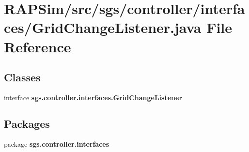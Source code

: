 \section{R\-A\-P\-Sim/src/sgs/controller/interfaces/\-Grid\-Change\-Listener.java File Reference}
\label{_grid_change_listener_8java}
\subsection*{Classes}
\begin{DoxyCompactItemize}
\item 
interface {\bf sgs.\-controller.\-interfaces.\-Grid\-Change\-Listener}
\end{DoxyCompactItemize}
\subsection*{Packages}
\begin{DoxyCompactItemize}
\item 
package {\bf sgs.\-controller.\-interfaces}
\end{DoxyCompactItemize}
